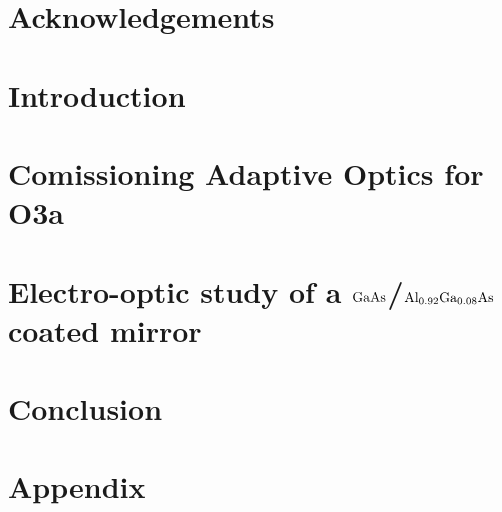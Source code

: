 \documentclass[12pt]{report}
\newcommand{\algaas}{\mathrm{Al_{0.92}Ga_{0.08}As}}
\newcommand{\gaas}{\mathrm{GaAs}}
\begin{document}
\chapter*{Acknowledgements}


\tableofcontents

\newpage


\chapter{Introduction}

\newpage

\chapter{Comissioning Adaptive Optics for O3a}


\chapter{Electro-optic study of a $\protect\gaas$/$\protect\algaas$ coated mirror}


\chapter{Conclusion}



\newpage
\chapter{Appendix}




\end{document}
